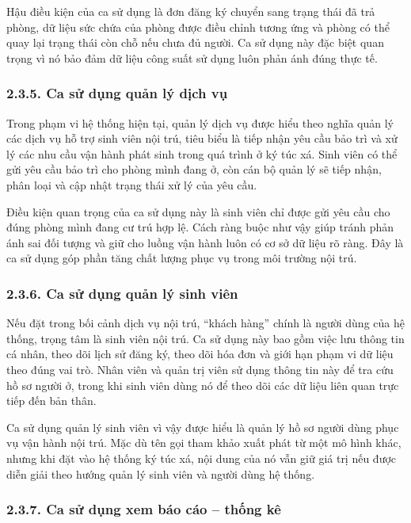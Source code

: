 \documentclass[12pt]{article}
\begin{document}
Hậu điều kiện của ca sử dụng là đơn đăng ký chuyển sang trạng thái đã trả phòng, dữ liệu sức chứa của phòng được điều chỉnh tương ứng và phòng có thể quay lại trạng thái còn chỗ nếu chưa đủ người. Ca sử dụng này đặc biệt quan trọng vì nó bảo đảm dữ liệu công suất sử dụng luôn phản ánh đúng thực tế.

\subsubsection*{2.3.5. Ca sử dụng quản lý dịch vụ}

Trong phạm vi hệ thống hiện tại, quản lý dịch vụ được hiểu theo nghĩa quản lý các dịch vụ hỗ trợ sinh viên nội trú, tiêu biểu là tiếp nhận yêu cầu bảo trì và xử lý các nhu cầu vận hành phát sinh trong quá trình ở ký túc xá. Sinh viên có thể gửi yêu cầu bảo trì cho phòng mình đang ở, còn cán bộ quản lý sẽ tiếp nhận, phân loại và cập nhật trạng thái xử lý của yêu cầu.

Điều kiện quan trọng của ca sử dụng này là sinh viên chỉ được gửi yêu cầu cho đúng phòng mình đang cư trú hợp lệ. Cách ràng buộc như vậy giúp tránh phản ánh sai đối tượng và giữ cho luồng vận hành luôn có cơ sở dữ liệu rõ ràng. Đây là ca sử dụng góp phần tăng chất lượng phục vụ trong môi trường nội trú.

\subsubsection*{2.3.6. Ca sử dụng quản lý sinh viên}

Nếu đặt trong bối cảnh dịch vụ nội trú, “khách hàng” chính là người dùng của hệ thống, trọng tâm là sinh viên nội trú. Ca sử dụng này bao gồm việc lưu thông tin cá nhân, theo dõi lịch sử đăng ký, theo dõi hóa đơn và giới hạn phạm vi dữ liệu theo đúng vai trò. Nhân viên và quản trị viên sử dụng thông tin này để tra cứu hồ sơ người ở, trong khi sinh viên dùng nó để theo dõi các dữ liệu liên quan trực tiếp đến bản thân.

Ca sử dụng quản lý sinh viên vì vậy được hiểu là quản lý hồ sơ người dùng phục vụ vận hành nội trú. Mặc dù tên gọi tham khảo xuất phát từ một mô hình khác, nhưng khi đặt vào hệ thống ký túc xá, nội dung của nó vẫn giữ giá trị nếu được diễn giải theo hướng quản lý sinh viên và người dùng hệ thống.

\subsubsection*{2.3.7. Ca sử dụng xem báo cáo -- thống kê}
\end{document}
